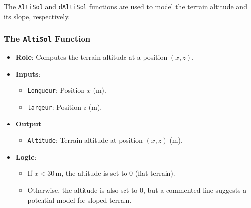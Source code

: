 \documentclass[10pt,a4paper]{report}
\begin{document}
The \texttt{AltiSol} and \texttt{dAltiSol} functions are used to model the terrain altitude and its slope, respectively.

\subsubsection{The \texttt{AltiSol} Function}
\begin{itemize}
    \item \textbf{Role}: Computes the terrain altitude at a position \((x, z)\).
    \item \textbf{Inputs}:
    \begin{itemize}
        \item \texttt{Longueur}: Position \(x\) (m).
        \item \texttt{largeur}: Position \(z\) (m).
    \end{itemize}
    \item \textbf{Output}:
    \begin{itemize}
        \item \texttt{Altitude}: Terrain altitude at position \((x, z)\) (m).
    \end{itemize}
    \item \textbf{Logic}:
    \begin{itemize}
        \item If \(x < 30 \, \text{m}\), the altitude is set to \(0\) (flat terrain).
        \item Otherwise, the altitude is also set to \(0\), but a commented line suggests a potential model for sloped terrain.
    \end{itemize}
\end{itemize}
\end{document}
